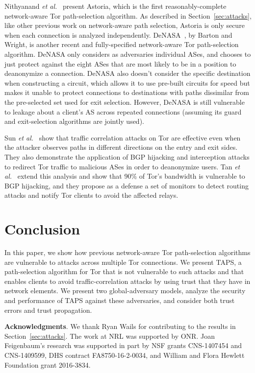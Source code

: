 \documentclass[conference]{styles/IEEEtran}
\newcommand{\etal}{\emph{et al.}}
\newcommand{\point}[1]{\noindent\textbf{#1}.}
\newcommand{\ps}{TAPS\xspace}
\begin{document}
Nithyanand \etal~\cite{astoria-ndss2016} present Astoria, which is
the first reasonably-complete network-aware Tor path-selection algorithm.
As described in Section~\ref{sec:attacks}, like other previous work on
network-aware path selection, Astoria is only secure when each connection
is analyzed independently. DeNASA~\cite{denasa-pets2016}, by Barton and
Wright, is another recent and fully-specified
network-aware Tor path-selection algorithm. DeNASA only considers as
adversaries individual ASes, and chooses to just protect against the eight
ASes that are most likely to be in a position to deanonymize a connection.
DeNASA also doesn't consider the specific destination when constructing
a circuit, which allows it to use pre-built circuits for speed but makes it
unable to protect connections to destinations with paths dissimilar from
the pre-selected set used for exit selection. However, DeNASA is still
vulnerable to leakage about a client's AS across repeated connections
(assuming its guard and exit-selection algorithms are jointly used).

Sun \etal~\cite{raptor-usenix2015} show that traffic correlation attacks
on Tor are effective even when the attacker observes paths in different
directions on the entry and exit sides. They also demonstrate the application
of BGP hijacking and interception attacks to redirect
Tor traffic to malicious ASes in order to deanonymize users.
Tan \etal~\cite{tor-dataplane-defenses} extend this analysis and show that
90\% of Tor's bandwidth is vulnerable to BGP hijacking, and they propose
as a defense a set of monitors to detect routing attacks and notify Tor
clients to avoid the affected relays.

 \section{Conclusion}

In this paper, we show how previous network-aware Tor
path-selection algorithms are vulnerable to attacks across multiple Tor connections.
We present \ps, a path-selection algorithm
for Tor that is not vulnerable to such attacks and that enables clients to avoid
traffic-correlation attacks by using trust that they have in network elements.
We present two global-adversary models, analyze the security
and performance of \ps against these adversaries, and consider both trust errors and trust
propagation.

%
 
\point{Acknowledgments}
We thank Ryan Wails for contributing to the results in Section~\ref{sec:attacks}.
The work at NRL was supported by ONR.
Joan Feigenbaum's research was supported in part by NSF grants CNS-1407454 and CNS-1409599, DHS
contract FA8750-16-2-0034, and William and Flora Hewlett Foundation grant 2016-3834.
\end{document}
